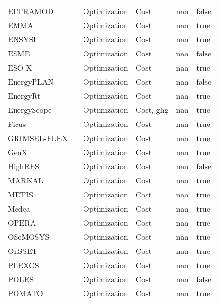 \begin{tabular}{llllrl}
ELTRAMOD   &  \cite{ladwig_demand_2018}  &  Optimization   &  Cost  & nan &  false   \\
EMMA   &  \cite{hirth_european_2021}  &  Optimization   &  Cost  & nan &  true   \\
ENSYSI   &  \cite{limpens_energyscope_2019} &  Optimization   &  Cost  & nan &  true   \\
ESME   &  \cite{heaton_modelling_2014}  &  Optimization   &  Cost  & nan &  false   \\
ESO-X  &  \cite{heuberger_power_2017}  &  Optimization   &  Cost  & nan &  true   \\
EnergyPLAN   &  \cite{lund_energyplan_2021} &  Optimization   &  Cost  & nan &  false  \\
EnergyRt   &  \cite{lugovoy_energyrt_2022}  &  Optimization   &  Cost  & nan &  true   \\
EnergyScope  &  \cite{limpens_energyscope_2019}  &  Optimization   &  Cost, \acs{ghg}  & nan &  true   \\
Ficus   & \cite{atabay_open-source_2017}  &  Optimization   &  Cost  & nan &  true   \\
GRIMSEL-FLEX  &  \cite{rinaldi_what_2022}  &  Optimization   &  Cost  & nan &  true   \\
GenX   &  \cite{jenkins_genx_2022}  &  Optimization   &  Cost  & nan &  true   \\
HighRES   &  \cite{zeyringer_designing_2018}  &  Optimization   &  Cost  & nan &  false   \\
MARKAL   &  \cite{loulou_documentation_2004}  &  Optimization   &  Cost  & nan &  true   \\
METIS   &  \cite{sakellaris_metis_2018}  &  Optimization   &  Cost  & nan &  true   \\
Medea   &  \cite{wehrle_cost_2021}  &  Optimization   &  Cost  & nan &  true   \\
OPERA   &  \cite{van_stralen_opera_2021}  &  Optimization   &  Cost  & nan &  true   \\
OSeMOSYS   &  \cite{howells_osemosys_2011}  &  Optimization   &  Cost  & nan &  true   \\
OnSSET   &  \cite{mentis_gis-based_2015}  &  Optimization   &  Cost  & nan &  true   \\
PLEXOS   & \cite{deane_quantifying_2015}  &  Optimization   &  Cost  & nan &  true   \\
POLES   &  \cite{vandyck_global_2016}   &  Optimization   &  Cost  & nan &  false   \\
POMATO   &  \cite{weinhold_power_2021}   &  Optimization   &  Cost  & nan &  true   \\

\end{tabular}
